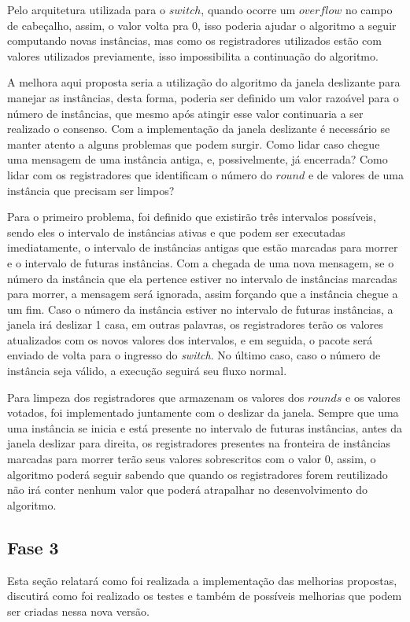 \documentclass[12pt,
openright, 
oneside,
a4paper,
brazil]{facom-ufu-abntex2}
\theoremstyle{definition}
\begin{document}
Pelo arquitetura utilizada para o $switch$, quando ocorre um $overflow$ no campo de cabeçalho, assim,
o valor volta pra 0, isso poderia ajudar o algoritmo a seguir computando novas instâncias, mas como
os registradores utilizados estão com valores utilizados previamente, isso impossibilita a continuação
do algoritmo.

A melhora aqui proposta seria a utilização do algoritmo da janela deslizante para manejar as instâncias,
desta forma, poderia ser definido um valor razoável para o número de instâncias, que mesmo após atingir
esse valor continuaria a ser realizado o consenso. Com a implementação da janela deslizante é necessário
se manter atento a alguns problemas que podem surgir. Como lidar caso chegue uma mensagem
de uma instância antiga, e, possivelmente, já encerrada? Como lidar com os registradores que identificam
o número do $round$ e de valores de uma instância que precisam ser limpos?

Para o primeiro problema, foi definido que existirão três intervalos possíveis, sendo eles o intervalo
de instâncias ativas e que podem ser executadas imediatamente, o intervalo de instâncias antigas que
estão marcadas para morrer e o intervalo de futuras instâncias. Com a chegada de uma nova mensagem, se o 
número da instância que ela pertence estiver no intervalo de instâncias marcadas para morrer, a mensagem
será ignorada, assim forçando que a instância chegue a um fim. Caso o número da instância estiver no
intervalo de futuras instâncias, a janela irá deslizar 1 casa, em outras palavras, os registradores terão
os valores atualizados com os novos valores dos intervalos, e em seguida, o pacote será enviado de volta 
para o ingresso do \textit{switch}. No último caso, caso o número de instância seja válido,
a execução seguirá seu fluxo normal.

Para limpeza dos registradores que armazenam os valores dos $rounds$ e os valores votados, foi implementado
juntamente com o deslizar da janela. Sempre que uma uma instância se inicia e está presente no intervalo de
futuras instâncias, antes da janela deslizar para direita, os registradores presentes na fronteira de 
instâncias marcadas para morrer terão seus valores sobrescritos com o valor 0, assim, o algoritmo poderá
seguir sabendo que quando os registradores forem reutilizado não irá conter nenhum valor que poderá atrapalhar
no desenvolvimento do algoritmo.

\subsection{Fase 3}
Esta seção relatará como foi realizada a implementação das melhorias propostas, discutirá como foi realizado
os testes e também de possíveis melhorias que podem ser criadas nessa nova versão.
\end{document}
